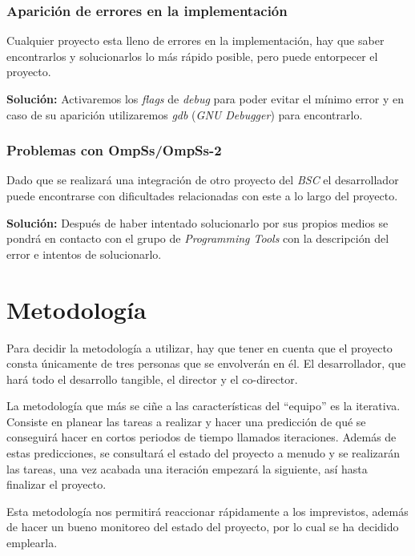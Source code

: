\subsubsection{Aparición de errores en la implementación}

Cualquier proyecto esta lleno de errores en la implementación, hay que saber encontrarlos y solucionarlos lo más rápido posible, pero puede entorpecer el proyecto.
\par\medskip

\textbf{Solución:} Activaremos los \textit{flags} de \textit{debug} para poder evitar el mínimo error y en caso de su aparición utilizaremos \textit{gdb} (\textit{GNU Debugger}) para encontrarlo.

\subsubsection{Problemas con OmpSs/OmpSs-2}

Dado que se realizará una integración de otro proyecto del \textit{BSC} el desarrollador puede encontrarse con dificultades relacionadas con este a lo largo del proyecto.
\par\medskip

\textbf{Solución:} Después de haber intentado solucionarlo por sus propios medios se pondrá en contacto con el grupo de \textit{Programming Tools} con la descripción del error e intentos de solucionarlo.

\section{Metodología}

Para decidir la metodología a utilizar, hay que tener en cuenta que el proyecto consta únicamente de tres personas que se envolverán en él. El desarrollador, que hará todo el desarrollo tangible, el director y el co-director. 
\par\bigskip

La metodología que más se ciñe a las características del ``equipo'' es la iterativa. Consiste en planear las tareas a realizar y hacer una predicción de qué se conseguirá hacer en cortos periodos de tiempo llamados iteraciones. Además de estas predicciones, se consultará el estado del proyecto a menudo y se realizarán las tareas, una vez acabada una iteración empezará la siguiente, así hasta finalizar el proyecto.
\par\bigskip
Esta metodología nos permitirá reaccionar rápidamente a los imprevistos, además de hacer un bueno monitoreo del estado del proyecto, por lo cual se ha decidido emplearla.

